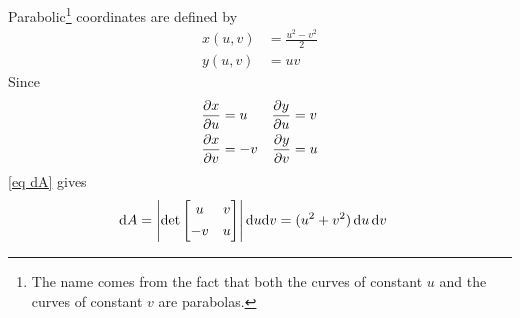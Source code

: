 \begin{eg}\label{eg parabolic dA}
Parabolic\footnote{The name comes from the fact that both the curves of constant $u$ and the curves of constant $v$ are parabolas.} coordinates are defined by
\begin{align*}
x(u,v) &= \frac{u^2-v^2}{2} \\
y(u,v) &= uv 
\end{align*}
Since
\begin{align*}
\pdiff{x}{u}&= u   &\pdiff{y}{u}&=v \\
\pdiff{x}{v}&=-v   &\pdiff{y}{v}&=u \\
\end{align*}
\eqref{eq dA} gives
\begin{align*}
\mathrm{d}A &= \left|\det\left[\begin{matrix} u & v \\[0.05in] 
                                         -v & u 
       \end{matrix}\right]\right| \mathrm{d}u\mathrm{d}v 
   = (u^2+v^2)\,\mathrm{d}u\,\mathrm{d}v
\end{align*}

\end{eg}



